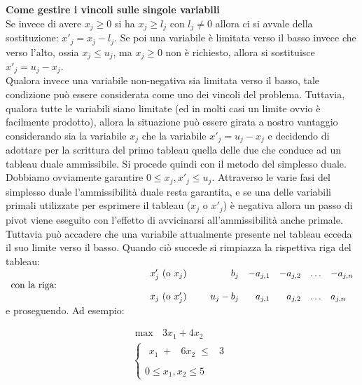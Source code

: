 \documentclass[10pt]{article}
\begin{document}
{\large \bf Come gestire i vincoli sulle singole variabili}\\

Se invece di avere $x_j \geq 0$ si ha $x_j \geq l_j$
con $l_j\neq 0$ allora ci si avvale della sostituzione:
$x'_j = x_j - l_j$.
Se poi una variabile \`e limitata verso il basso
invece che verso l'alto, 
ossia $x_j \leq u_j$,
ma $x_j \geq 0$ non \`e richiesto,
allora si sostituisce 
$x'_j = u_j - x_j$.\\ 

Qualora invece una variabile non-negativa
sia limitata verso il basso,
tale condizione pu\`o essere considerata
come uno dei vincoli del problema.
Tuttavia, qualora tutte le variabili siano limitate
(ed in molti casi un limite ovvio \`e facilmente prodotto),
allora la situazione pu\`o essere girata a nostro vantaggio
considerando sia la variabile $x_j$ che
la variabile $x'_j = u_j - x_j$
e decidendo di adottare per la scrittura
del primo tableau quella delle due che
conduce ad un tableau duale ammissibile.
Si procede quindi con il metodo del simplesso duale.
Dobbiamo ovviamente garantire $0\leq x_j,x'_j \leq u_j$.
Attraverso le varie fasi del simplesso duale
l'ammissibilit\`a duale resta garantita,
e se una delle variabili primali utilizzate per esprimere
il tableau ($x_j$ o $x'_j$) \`e negativa allora 
un passo di pivot viene eseguito con l'effetto
di avvicinarsi all'ammissibilit\`a anche primale.
Tuttavia pu\`o accadere che una variabile attualmente
presente nel tableau ecceda il suo limite verso il basso.
Quando ci\`o succede si rimpiazza la rispettiva riga del tableau:\\

\noindent
$
\begin{array}{llrrrrl}
 &x'_j \mbox{ (o $x_j$) \hspace{0.3cm} } &
        b_j & -a_{j,1} & -a_{j,2} & \ldots & -a_{j,n}\\ 
\mbox{con la riga: \hspace{3cm}}\\
 &x_j \mbox{ (o $x'_j$) \hspace{0.3cm} } &
        u_j - b_j & a_{j,1} & a_{j,2} & \ldots & a_{j,n}\\ 
\end{array}
$ \\

e proseguendo.  Ad esempio:

\[
   \begin{array}{l}
        \max \mbox{\ }3x_1 + 4x_2 \\
        \left\{
        \begin{array}{l}
        \begin{array}{rrrr}
             x_1 \;+&  6x_2 \;\leq &   3 \\
        \end{array} \\
        0 \leq x_1, x_2  \leq 5    
        \end{array}
        \right.
   \end{array}
\]
\end{document}
